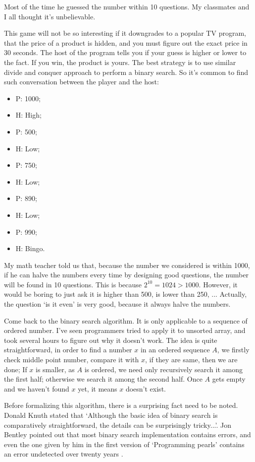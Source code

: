 \documentclass[UTF8]{article}
\begin{document}
Most of the time he guessed the number within 10 questions. My classmates and I all thought it's unbelievable.

This game will not be so interesting if it downgrades to a popular TV program, that the price of a product
is hidden, and you must figure out the exact price in 30 seconds. The host of the program tells you if
your guess is higher or lower to the fact. If you win, the product is yours. The best strategy is
to use similar divide and conquer approach to perform a binary search. So it's common to find such
conversation between the player and the host:

\begin{itemize}
\item P: 1000;
\item H: High;
\item P: 500;
\item H: Low;
\item P: 750;
\item H: Low;
\item P: 890;
\item H: Low;
\item P: 990;
\item H: Bingo.
\end{itemize}

My math teacher told us that, because the number we considered is within 1000, if he can halve the
numbers every time by designing good questions, the number will be found in 10 questions. This is because
$2^{10} = 1024 > 1000$. However, it would be boring to just ask it is higher than 500, is lower
than 250, ... Actually, the question `is it even' is very good, because it always
halve the numbers.

Come back to the binary search algorithm. It is only applicable to a sequence of ordered number.
I've seen programmers tried to apply it to unsorted array, and took several hours to figure out
why it doesn't work. The idea is quite straightforward, in order to find a number $x$ in an
ordered sequence $A$, we firstly check middle point number, compare it with $x$, if
they are same, then we are done; If $x$ is smaller, as $A$ is ordered, we need only
recursively search it among the first half; otherwise we search it among the second half.
Once $A$ gets empty and we haven't found $x$ yet, it means $x$ doesn't exist.

Before formalizing this algorithm, there is a surprising fact need to be noted. Donald Knuth stated that
`Although the basic idea of binary search is comparatively straightforward,
the details can be surprisingly tricky...'. Jon Bentley pointed out that most binary search implementation
contains errors, and even the one given by him in the first version of `Programming pearls' contains
an error undetected over twenty years \cite{programming-pearls}.
\end{document}
